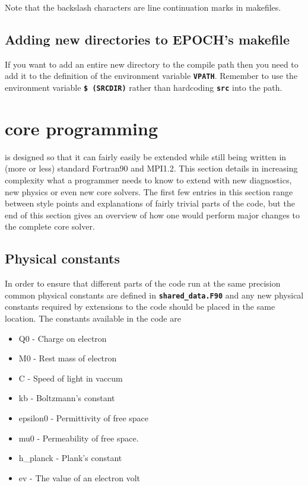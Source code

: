 \documentclass[12pt,a4paper]{article}
\newcommand{\inlinecode}[1]{{\color{warwickred} \bf\texttt{#1}}}
\newcommand{\EPOCH}{{\color{warwickdark}\fontfamily{phv}\selectfont{EPOCH}}}
\begin{document}
Note that the backslash characters are line continuation marks in makefiles.

\subsection{Adding new directories to EPOCH's makefile}
If you want to add an entire new directory to the {\EPOCH} compile path then you
need to add it to the definition of the environment variable
\inlinecode{VPATH}. Remember to use the environment variable \inlinecode{\$
(SRCDIR)} rather than hardcoding \inlinecode{src} into the path.

\section{{\EPOCH} core programming}
{\EPOCH} is designed so that it can fairly easily be extended while still being
written in (more or less) standard Fortran90 and MPI1.2. This section details
in increasing complexity what a programmer needs to know to extend {\EPOCH} with
new diagnostics, new physics or even new core solvers. The first few entries
in this section range between style points and explanations of fairly trivial
parts of the {\EPOCH} code, but the end of this section gives an overview of how
one would perform major changes to the complete {\EPOCH} core solver.

\subsection{Physical constants}
In order to ensure that different parts of the code run at the same precision
common physical constants are defined in \inlinecode{shared\_data.F90} and any
new physical constants required by extensions to the code should be placed in
the same location. The constants available in the code are
\begin{itemize}
\item Q0 - Charge on electron
\item M0 - Rest mass of electron
\item C - Speed of light in vaccum
\item kb - Boltzmann's constant
\item epsilon0 - Permittivity of free space
\item mu0 - Permeability of free space.
\item h\_planck - Plank's constant
\item ev - The value of an electron volt
\end{itemize}
\end{document}
